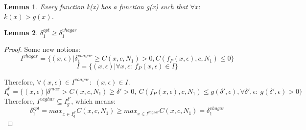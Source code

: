 \begin{comment}
\documentclass[11pt]{article}
\usepackage[a4paper, portrait, margin=1in]{geometry}
\usepackage{graphicx}
\usepackage{hyperref}
\usepackage{caption}
\usepackage[labelformat=simple]{subcaption}    %
\renewcommand{\thesubfigure}{\normalsize Figure \thefigure. (\alph{subfigure}):}
\usepackage{cjhebrew}
\usepackage{float}
\usepackage{eldar_report}
\usepackage{amsmath}
\usepackage{amsfonts}
\newcommand\normx[1]{\Vert#1\Vert}
\usepackage{graphicx}
\usepackage{enumitem}
\usepackage{lifetime}
\usepackage{booktabs}
\usepackage{makecell}
\usepackage{graphicx}
\usepackage{multirow}
\usepackage{comment}
\usepackage{array}
\usepackage[english]{babel}
\usepackage{amsthm}
\usepackage{float}
\newcommand{\Dana}[1]{\textcolor{purple}{\bf Dana: #1}}
\newcommand{\Neta}[1]{\textcolor{purple}{\bf Neta: #1}}


\end{comment}

\newtheorem{theorem}{Theorem}[section]
\newtheorem{lemma}[theorem]{Lemma}
\begin{lemma}\label{lem:functionTheory}
Every function k(x) has a function g(x) such that $\forall{x}:$ $k(x)>g(x)$.
\end{lemma}

\begin{lemma}
$\delta_1^{opt} \geq \delta^{vhagar}_1$
\end{lemma}
\begin{proof}
Some new notions:
$$I^{vhagar} = \{(x,\epsilon)|\delta_1^{vhagar} \geq C(x,c,N_1) > 0 , C(f_P(x,\epsilon),c,N_1)\leq 0 \}$$
$$I = \{(x,\epsilon)|\forall{x,\epsilon}:\ f_P(x,\epsilon)\in{I}\}$$

Therefore, $\forall{(x,\epsilon)}\in{I^{vhagar}}:$ $(x,\epsilon)\in{I}$.%
$$I^{\delta'}_g = \{(x,\epsilon)|\delta^{max}> C(x,c,N_1) \geq \delta' > 0 ,\ C(f_P(x,\epsilon),c,N_1)\leq g(\delta',\epsilon), \forall{\delta',\epsilon}:\ g(\delta',\epsilon)>0 \} $$
Therefore, $I^{vaghar}\subseteq{I^{\delta'}_g}$, which means:
$$ \delta_1^{opt}=max_{x\in{I^{\delta'}_g}}{C(x,c,N_1)} \geq max_{x\in{I^{vaghar}}}{C(x,c,N_1)}=\delta_1^{vhagar}$$
\end{proof}

